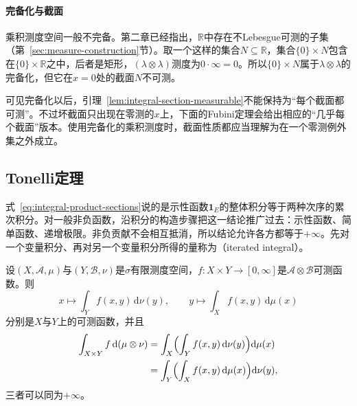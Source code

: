\paragraph{完备化与截面}
乘积测度空间一般不完备。第二章已经指出，$\mathbb R$中存在不Lebesgue可测的子集（第~\ref{sec:measure-construction}节）。取一个这样的集合$N\subseteq\mathbb R$，集合$\{0\}\times N$包含在$\{0\}\times\mathbb R$之中，后者是矩形，$(\lambda\otimes\lambda)$测度为$0\cdot\infty=0$。所以$\{0\}\times N$属于$\lambda\otimes\lambda$的完备化，但它在$x=0$处的截面$N$不可测。

可见完备化以后，引理~\ref{lem:integral-section-measurable}不能保持为“每个截面都可测”。不过坏截面只出现在零测的$x$上，下面的Fubini定理会给出相应的“几乎每个截面”版本。使用完备化的乘积测度时，截面性质都应当理解为在一个零测例外集之外成立。

\subsection{Tonelli定理}
\label{sec:integral-tonelli}

式~\eqref{eq:integral-product-sections}说的是示性函数$\mathbf 1_E$的整体积分等于两种次序的累次积分。对一般非负函数，沿积分的构造步骤把这一结论推广过去：示性函数、简单函数、递增极限。非负贡献不会相互抵消，所以结论允许各方都等于$+\infty$。先对一个变量积分、再对另一个变量积分所得的量称为（iterated integral）。

\begin{theorem}[Tonelli定理]
\label{thm:analysis-tonelli-fubini}
设$(X,\mathcal A,\mu)$与$(Y,\mathcal B,\nu)$是$\sigma$有限测度空间，$f:X\times Y\to[0,\infty]$是$\mathcal A\otimes\mathcal B$可测函数。则
\[
 x\longmapsto\int_Yf(x,y)\,\mathrm d\nu(y),\qquad y\longmapsto\int_Xf(x,y)\,\mathrm d\mu(x)
\]
分别是$X$与$Y$上的可测函数，并且
\begin{equation}
 \begin{aligned}
 \int_{X\times Y}f\,\mathrm d(\mu\otimes\nu)
 &=\int_X\Bigl(\int_Yf(x,y)\,\mathrm d\nu(y)\Bigr)\mathrm d\mu(x)\\
 &=\int_Y\Bigl(\int_Xf(x,y)\,\mathrm d\mu(x)\Bigr)\mathrm d\nu(y),
 \end{aligned}
 \label{eq:integral-tonelli}
\end{equation}
三者可以同为$+\infty$。
\end{theorem}

